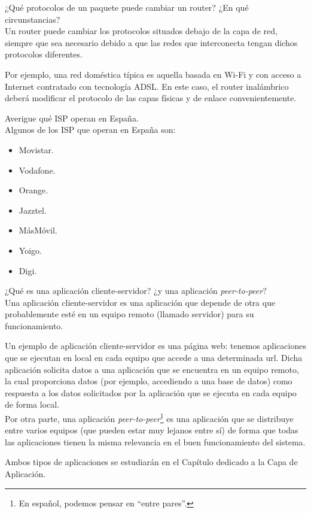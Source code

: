 \begin{ejercicio}
    ¿Qué protocolos de un paquete puede cambiar un router? ¿En qué circunstancias?\\

    Un router puede cambiar los protocolos situados debajo de la capa de red, siempre que sea necesario debido a que las redes que interconecta tengan dichos protocolos diferentes.
    
    Por ejemplo, una red doméstica típica es aquella basada en Wi-Fi  y con acceso a Internet contratado con tecnología ADSL\@. En este caso, el router inalámbrico deberá modificar el protocolo de las capas físicas y de enlace convenientemente.
\end{ejercicio}

\begin{ejercicio}
    Averigue qué \acrshort{ISP} operan en España.\\

    Algunos de los \acrshort{ISP} que operan en España son:
    \begin{itemize}
        \item Movistar.
        \item Vodafone.
        \item Orange.
        \item Jazztel.
        \item MásMóvil.
        \item Yoigo.
        \item Digi.
    \end{itemize}
\end{ejercicio}

\begin{ejercicio}
    ¿Qué es una aplicación cliente-servidor? ¿y una aplicación \textit{peer-to-peer}?\\

    Una aplicación cliente-servidor es una aplicación que depende de otra que probablemente esté en un equipo remoto (llamado servidor) para su funcionamiento. 

    Un ejemplo de aplicación cliente-servidor es una página web: tenemos aplicaciones que se ejecutan en local en cada equipo que accede a una determinada url. Dicha aplicación solicita datos a una aplicación que se encuentra en un equipo remoto, la cual proporciona datos (por ejemplo, accediendo a una base de datos) como respuesta a los datos solicitados por la aplicación que se ejecuta en cada equipo de forma local.\\

    Por otra parte, una aplicación \textit{peer-to-peer}\footnote{En español, podemos pensar en ``entre pares''.} es una aplicación que se distribuye entre varios equipos (que pueden estar muy lejanos entre sí) de forma que todas las aplicaciones tienen la misma relevancia en el buen funcionamiento del sistema.

    Ambos tipos de aplicaciones se estudiarán en el Capítulo dedicado a la Capa de Aplicación.
\end{ejercicio}

